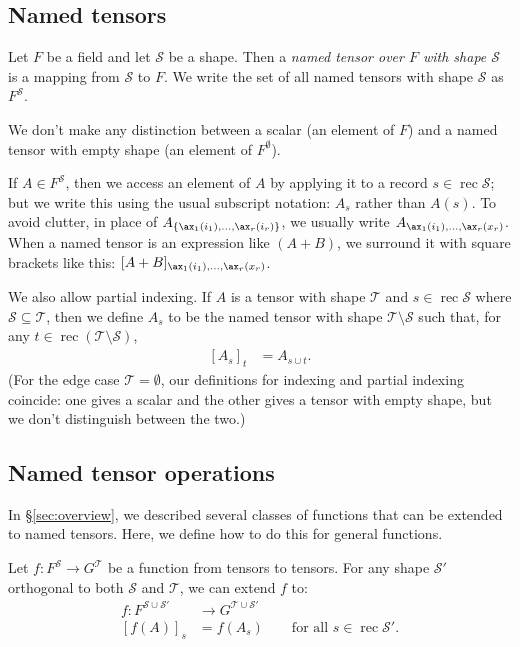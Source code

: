 \documentclass{article}
\DeclareMathOperator{\rec}{rec}
\begin{document}
\subsection{Named tensors}

Let $F$ be a field and let $\mathcal{S}$ be a shape. Then a \emph{named tensor over $F$ with shape $\mathcal{S}$} is a mapping from $\mathcal{S}$ to $F$. We write the set of all named tensors with shape $\mathcal{S}$ as $F^{\mathcal{S}}$.

We don't make any distinction between a scalar (an element of $F$) and a named tensor with empty shape (an element of $F^\emptyset$).

If $A \in F^{\mathcal{S}}$, then we access an element of $A$ by applying it to a record $s \in \rec \mathcal{S}$; but we write this using the usual subscript notation: $A_s$ rather than $A(s)$. To avoid clutter, in place of $A_{\{\ax_1(i_1), \ldots, \ax_r(i_r)\}}$, we usually write $A_{\ax_1(i_1), \ldots, \ax_r(x_r)}$. When a named tensor is an expression like $(A+B)$, we surround it with square brackets like this: $[A+B]_{\ax_1(i_1), \ldots, \ax_r(x_r)}$.

We also allow partial indexing. If $A$ is a tensor with shape $\mathcal{T}$ and $s \in \rec \mathcal{S}$ where $\mathcal{S} \subseteq \mathcal{T}$, then we define $A_s$ to be the named tensor with shape $\mathcal{T} \setminus \mathcal{S}$ such that, for any $t \in \rec (\mathcal{T} \setminus \mathcal{S})$,
\begin{align*}
\left[A_s\right]_t &= A_{s \cup t}.
\end{align*}
(For the edge case $\mathcal{T} = \emptyset$, our definitions for indexing and partial indexing coincide: one gives a scalar and the other gives a tensor with empty shape, but we don't distinguish between the two.)

\subsection{Named tensor operations}
\label{sec:tensorfunctions}

In \S\ref{sec:overview}, we described several classes of functions that can be extended to named tensors. Here, we define how to do this for general functions.

Let $f \colon F^{\mathcal{S}} \rightarrow G^{\mathcal{T}}$ be a function from tensors to tensors. For any shape $\mathcal{S'}$ orthogonal to both $\mathcal{S}$ and $\mathcal{T}$, we can extend $f$ to:
\begin{align*}
f \colon F^{\mathcal{S} \cup \mathcal{S'}} &\rightarrow G^{\mathcal{T} \cup \mathcal{S'}} \\
[f(A)]_s &= f(A_s) \qquad \text{for all $s \in \rec\mathcal{S'}$.}
\end{align*}
\end{document}
